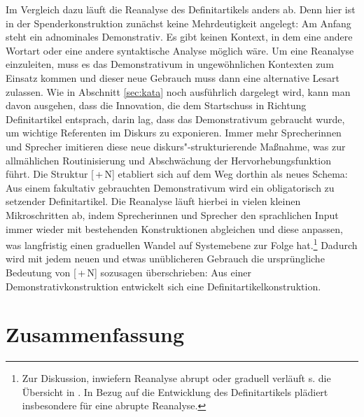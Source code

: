 Im Vergleich dazu läuft die Reanalyse des Definitartikels anders ab. Denn hier ist in der Spenderkonstruktion zunächst keine Mehrdeutigkeit angelegt: Am Anfang steht  ein adnominales Demonstrativ. Es gibt keinen Kontext, in dem eine andere Wortart oder eine andere syntaktische Analyse möglich wäre. Um eine Reanalyse einzuleiten, muss es das Demonstrativum in ungewöhnlichen Kontexten zum Einsatz kommen und dieser neue Gebrauch muss dann eine alternative Lesart zulassen. Wie in Abschnitt \ref{sec:kata} noch ausführlich dargelegt wird, kann man davon ausgehen, dass die Innovation, die dem Startschuss in Richtung Definitartikel entsprach, darin lag, dass das Demonstrativum  gebraucht wurde, um wichtige Referenten im Diskurs zu exponieren. Immer mehr Sprecherinnen und Sprecher imitieren diese neue diskurs"-strukturierende Maßnahme, was zur allmählichen Routinisierung und Abschwächung der Hervorhebungsfunktion führt. Die Struktur [\,+\,N] etabliert sich auf dem Weg dorthin als neues Schema: Aus einem fakultativ gebrauchten Demonstrativum wird ein obligatorisch zu setzender Definitartikel. Die Reanalyse läuft hierbei in vielen kleinen Mikroschritten ab, indem Sprecherinnen und Sprecher den sprachlichen Input immer wieder mit bestehenden Konstruktionen abgleichen und diese anpassen, was langfristig einen graduellen Wandel auf Systemebene zur Folge hat.\footnote{Zur Diskussion, inwiefern Reanalyse abrupt oder graduell verläuft s. die Übersicht in \textcite[75]{Traugott2013}. In Bezug auf die Entwicklung des Definitartikels plädiert insbesondere \textcite{Schlachter2015} für eine abrupte Reanalyse.} 
Dadurch wird mit jedem neuen und etwas unüblicheren Gebrauch die ursprüngliche Bedeutung von [\,+\,N] sozusagen überschrieben: Aus einer Demonstrativkonstruktion entwickelt sich eine Definitartikelkonstruktion.

  
\section{Zusammenfassung}

